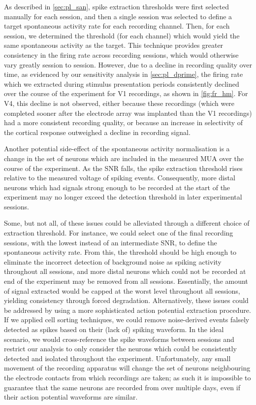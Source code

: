 As described in \autoref{sec:pl_san}, spike extraction thresholds were first selected manually for each session, and then a single session was selected to define a target spontaneous activity rate for each recording channel.
Then, for each session, we determined the threshold (for each channel) which would yield the same spontaneous activity as the target.
This technique provides greater consistency in the firing rate across recording sessions, which would otherwise vary greatly session to session.
However, due to a decline in recording quality over time, as evidenced by our sensitivity analysis in \autoref{sec:pl_dprime}, the firing rate which we extracted during stimulus presentation periods consistently declined over the course of the experiment for \ac{V1} recordings, as shown in \autoref{fig:fr_hm}.
For \ac{V4}, this decline is not observed, either because these recordings (which were completed sooner after the electrode array was implanted than the \ac{V1} recordings) had a more consistent recording quality, or because an increase in selectivity of the cortical response outweighed a decline in recording signal.

Another potential side-effect of the spontaneous activity normalisation is a change in the set of neurons which are included in the measured \ac{MUA} over the course of the experiment.
As the \ac{SNR} falls, the spike extraction threshold rises relative to the measured voltage of spiking events.
Consequently, more distal neurons which had signals strong enough to be recorded at the start of the experiment may no longer exceed the detection threshold in later experimental sessions.

Some, but not all, of these issues could be alleviated through a different choice of extraction threshold.
For instance, we could select one of the final recording sessions, with the lowest instead of an intermediate \ac{SNR}, to define the spontaneous activity rate.
From this, the threshold should be high enough to eliminate the incorrect detection of background noise as spiking activity throughout all sessions, and more distal neurons which could not be recorded at end of the experiment may be removed from all sessions.
Essentially, the amount of signal extracted would be capped at the worst level throughout all sessions, yielding consistency through forced degradation.
Alternatively, these issues could be addressed by using a more sophisticated action potential extraction procedure.
If we applied cell sorting techniques, we could remove noise-derived events falsely detected as spikes based on their (lack of) spiking waveform.
In the ideal scenario, we would cross-reference the spike waveforms between sessions and restrict our analysis to only consider the neurons which could be consistently detected and isolated throughout the experiment.
Unfortunately, any small movement of the recording apparatus will change the set of neurons neighbouring the electrode contacts from which recordings are taken; as such it is impossible to guarantee that the same neurons are recorded from over multiple days, even if their action potential waveforms are similar.

